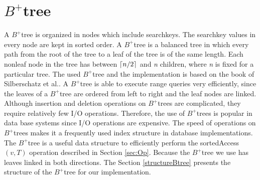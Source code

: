 \documentclass[abstracton,12pt,oneside]{scrreprt}
\DeclarePairedDelimiter\ceil{\lceil}{\rceil}
\begin{document}
\section{$B^+$tree}
\label{sec:BplusTree}
A $B^+$tree is organized in nodes which include searchkeys. The searchkey values in every node are kept in sorted order. A $B^+$tree is a balanced tree in which every path from the root of the
tree to a leaf of the tree is of the same length. Each nonleaf node in the tree has
between $\ceil{n/2}$ and \emph{n} children, where \emph{n} is fixed for a particular tree. The used $B^+$tree and the implementation is based on the book of Silberschatz et al.\cite{DatabaseSystemC}. A $B^+$tree is able to execute range queries very efficiently, since the leaves of a $B^+$tree are ordered from left to right and the leaf nodes are linked. Although insertion and deletion operations on $B^+$trees are complicated, they
require relatively few I/O operations. Therefore, the use of $B^+$trees is popular in data base systems since I/O operations are expensive. The speed of operations on $B^+$trees makes it a frequently used index structure in database implementations.\\
The $B^+$tree is a useful data structure to efficiently perform the sortedAccess$(v,T)$ operation described in Section \ref{sec:Op}. Because the $B^+$tree we use has leaves linked in both directions. The Section \ref{structureBtree} presents the structure of the $B^+$tree for our implementation.
\end{document}
